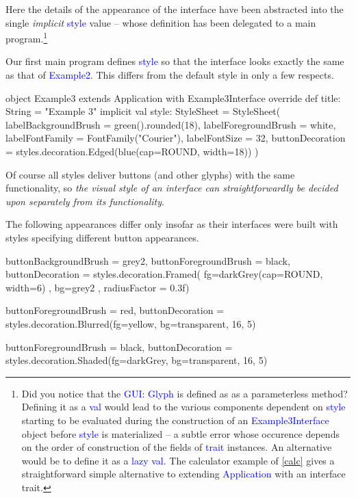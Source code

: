 \documentclass[12pt,a4paper]{article}
\def\Scala#1{\textcolor{blue}{\textsf{#1}}}
\begin{document}
Here the details of the appearance of the interface have been
abstracted into the single \textit{implicit } \Scala{style} value
-- whose definition has been delegated to a main program.\footnote{
Did you notice that the  \Scala{GUI: Glyph} is defined as as a
parameterless method?  Defining it as a \Scala{val} would lead
to the various components dependent on \Scala{style} starting to be evaluated
during the construction of an \Scala{Example3Interface} object
before \Scala{style} is materialized -- a subtle error
whose occurence depends on the order of construction of
the fields of \Scala{trait} instances. An alternative would be
to define it as a \Scala {lazy val}. The calculator example of \ref{calc} gives
a straightforward simple alternative to extending \Scala{Application} with
an interface trait.}

\begin{center}
\end{center}

Our first main program defines \Scala{style} so that the
interface looks exactly the same as that of \Scala{Example2}.
This differs from the default style in only a few respects.
\begin{scala}
object Example3 extends Application with Example3Interface  {
    override def title: String = "Example 3"
    implicit val style: StyleSheet = StyleSheet(
      labelBackgroundBrush  = green().rounded(18),
      labelForegroundBrush  = white,
      labelFontFamily       = FontFamily("Courier"),
      labelFontSize         = 32,
      buttonDecoration = styles.decoration.Edged(blue(cap=ROUND, width=18))
    )
}
\end{scala}

Of course all styles deliver buttons (and other glyphs) with the
same functionality, so \textit{ the  visual style of an interface can
straightforwardly be decided upon separately from its functionality}.

The following appearances differ only insofar as their interfaces
were built with styles specifying different button appearances. 

\begin{center}
\begin{scala}
    buttonBackgroundBrush = grey2,
    buttonForegroundBrush = black,
    buttonDecoration =
      styles.decoration.Framed( fg=darkGrey(cap=ROUND, width=6)
                              , bg=grey2
                              , radiusFactor = 0.3f)
\end{scala}

\begin{scala}
  buttonForegroundBrush = red,
  buttonDecoration =
    styles.decoration.Blurred(fg=yellow, bg=transparent, 16, 5)
\end{scala}

\begin{scala}
  buttonForegroundBrush = black,
  buttonDecoration =
    styles.decoration.Shaded(fg=darkGrey, bg=transparent, 16, 5)
\end{scala}
\end{center}
\end{document}
